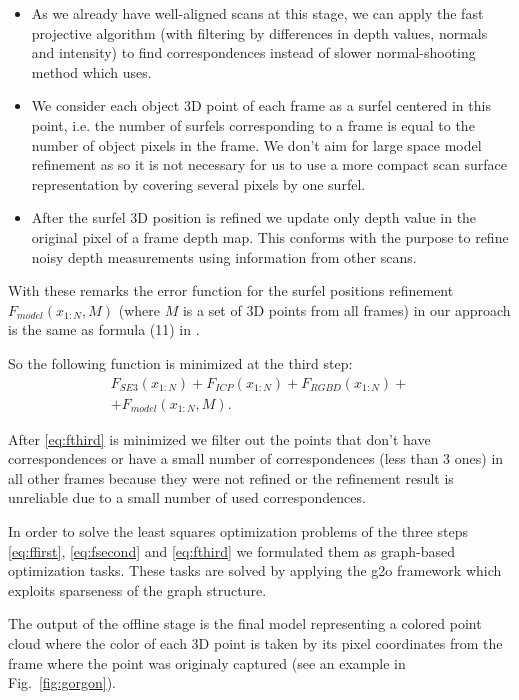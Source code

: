 \documentclass[letterpaper, 10 pt, conference]{ieeeconf}  %
\begin{document}
\begin{itemize}
 \item As we already have well-aligned scans at this stage, we can apply 
 the fast projective algorithm \cite{rusinkiewicz2001efficient} 
 (with filtering by differences in depth values, 
 normals and intensity) to find correspondences instead of slower
 normal-shooting method which \cite{ruhnke2012highly} uses.
 \item We consider each object 3D point of each frame as 
 a surfel centered in this point, i.e. the number of surfels corresponding to a frame
 is equal to the number of object pixels in the frame. 
 We don't aim for large space model refinement as \cite{ruhnke2012highly}
 so it is not necessary for us to use a more compact scan surface representation by covering several pixels 
 by one surfel.
 \item After the surfel 3D position is refined we update only depth value 
 in the original pixel of a frame depth map. This conforms with the purpose to 
 refine noisy depth measurements using information from other scans.
\end{itemize}

With these remarks the error function for the surfel positions refinement 
$F_{model}(x_{1:N}, M)$ (where $M$ is a set of 3D points from 
all frames) in our approach is the same as formula (11) in \cite{ruhnke2012highly}.

So the following function is minimized at the third step:
\begin{multline} \label{eq:fthird}
F_{SE3}(x_{1:N}) + F_{ICP}(x_{1:N}) + F_{RGBD}(x_{1:N}) + \\
+ F_{model}(x_{1:N}, M).
\end{multline}

After \eqref{eq:fthird} is minimized we filter out the points 
that don't have correspondences or have a small number of correspondences (less than 3 ones) in
all other frames because they were not refined or the refinement result
is unreliable due to a small number of used correspondences.

In order to solve the least squares optimization problems 
of the three steps \eqref{eq:ffirst}, \eqref{eq:fsecond} and \eqref{eq:fthird} 
we formulated them as graph-based optimization tasks.
These tasks are solved by applying the g2o framework 
\cite{kuemmerle2011g2o} which exploits sparseness of the graph structure.

The output of the offline stage is the final model representing
a colored point cloud where the color of each 3D point is taken 
by its pixel coordinates from the frame where the point was originaly 
captured (see an example in Fig.~\ref{fig:gorgon}).
\end{document}

